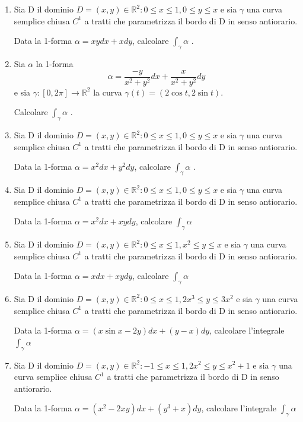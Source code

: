 \begin{enumerate}[label=\textbf{\arabic*}, leftmargin=*, start=1]
	
	\item Sia D il dominio \(D={(x,y)\in \mathbb R^2: 0\leq x \leq 1, 0\leq y\leq x}\) e sia $\gamma$ una curva semplice chiusa $C^1$ a tratti che parametrizza il bordo di D in senso antiorario.
	
	Data la 1-forma $\alpha=xydx+xdy$, calcolare $\int_\gamma \alpha$ .
	
	\item Sia $\alpha$ la 1-forma \[\alpha = \frac{-y}{x^2+y^2}dx + \frac{x}{x^2+y^2}dy\] e sia $\gamma:[0,2\pi]\to\mathbb R^2$ la curva $\gamma(t)=(2\cos t, 2\sin t)$. 
	
	Calcolare $\int_\gamma \alpha$ .
	
	\item Sia D il dominio \(D={(x,y)\in \mathbb R^2: 0\leq x \leq 1, 0\leq y\leq x}\) e sia $\gamma$ una curva semplice chiusa $C^1$ a tratti che parametrizza il bordo di D in senso antiorario.
	
	Data la 1-forma $\alpha=x^2dx+y^2dy$, calcolare $\int_\gamma \alpha$ .
	
	\item Sia D il dominio \(D={(x,y)\in \mathbb R^2: 0\leq x \leq 1, 0\leq y\leq x}\) e sia $\gamma$ una curva semplice chiusa $C^1$ a tratti che parametrizza il bordo di D in senso antiorario.
	
	Data la 1-forma $\alpha=x^2dx+xydy$, calcolare $\int_\gamma \alpha$
	
	\item Sia D il dominio \(D={(x,y)\in \mathbb R^2: 0\leq x \leq 1, x^2\leq y\leq x}\) e sia $\gamma$ una curva semplice chiusa $C^1$ a tratti che parametrizza il bordo di D in senso antiorario.
	
	Data la 1-forma $\alpha=xdx+xydy$, calcolare $\int_\gamma \alpha$
	
	\item Sia D il dominio \(D={(x,y)\in \mathbb R^2: 0\leq x \leq 1, 2x^3\leq y\leq 3x^2}\) e sia $\gamma$ una curva semplice chiusa $C^1$ a tratti che parametrizza il bordo di D in senso antiorario.
	
	Data la 1-forma $\alpha=(x\sin x - 2y)dx+(y-x)dy$, calcolare l'integrale $\int_\gamma \alpha$
	
	\item Sia D il dominio \(D={(x,y)\in \mathbb R^2: -1\leq x \leq 1, 2x^2\leq y\leq x^2+1}\) e sia $\gamma$ una curva semplice chiusa $C^1$ a tratti che parametrizza il bordo di D in senso antiorario.
	
	Data la 1-forma $\alpha=(x^2 - 2xy)dx+(y^3+x)dy$, calcolare l'integrale $\int_\gamma \alpha$
	
\end{enumerate}